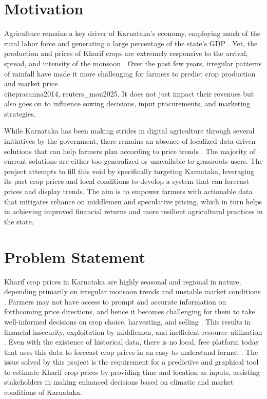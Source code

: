 \section[Motivation]{\textbf{Motivation}}

Agriculture remains a key driver of Karnataka's economy, employing much of the rural labor force and generating a large percentage of the state's GDP \cite{niti2024, kgisac2023}. Yet, the production and prices of Kharif crops are extremely responsive to the arrival, spread, and intensity of the monsoon \cite{prasanna2014, gadgil2006monsoon}. Over the past few years, irregular patterns of rainfall have made it more challenging for farmers to predict crop production and market price \\cite{prasanna2014, reuters_mon2025}. It does not just impact their revenues but also goes on to influence sowing decisions, input procurements, and marketing strategies.

While Karnataka has been making strides in digital agriculture through several initiatives by the government, there remains an absence of localized data-driven solutions that can help farmers plan according to price trends \cite{niti2024_gov}. The majority of current solutions are either too generalized or unavailable to grassroots users. The project attempts to fill this void by specifically targeting Karnataka, leveraging its past crop prices and local conditions to develop a system that can forecast prices and display trends. The aim is to empower farmers with actionable data that mitigates reliance on middlemen and speculative pricing, which in turn helps in achieving improved financial returns and more resilient agricultural practices in the state.

\section[Problem Statement]{\textbf{Problem Statement}}

Kharif crop prices in Karnataka are highly seasonal and regional in nature, depending primarily on irregular monsoon trends and unstable market conditions \cite{prasanna2014, gadgil2006monsoon, henrich2020rainfall}. Farmers may not have access to prompt and accurate information on forthcoming price directions, and hence it becomes challenging for them to take well-informed decisions on crop choice, harvesting, and selling \cite{cariappa2020impact, jain2020deep}. This results in financial insecurity, exploitation by middlemen, and inefficient resource utilization \cite{singh2024ai, niti2024}. Even with the existence of historical data, there is no local, free platform today that uses this data to forecast crop prices in an easy-to-understand format \cite{tripathi2021mapping, mahmud2025price}. The issue solved by this project is the requirement for a predictive and graphical tool to estimate Kharif crop prices by providing time and location as inputs, assisting stakeholders in making enhanced decisions based on climatic and market conditions of Karnataka.

